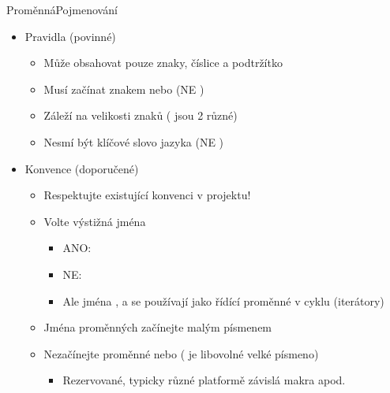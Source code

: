 \begin{frame}{Proměnná}{Pojmenování}

  \begin{itemize}
    \item Pravidla (povinné)
    \begin{itemize}
      \item Může obsahovat pouze znaky, číslice a podtržítko

      \pause

      \item Musí začínat znakem nebo \code{_} (NE )

      \pause

      \item Záleží na velikosti znaků ( jsou 2 různé)

      \pause

      \item Nesmí být klíčové slovo jazyka (NE )
    \end{itemize}

    \pause

    \item Konvence (doporučené)
    \begin{itemize}
      \item Respektujte existující konvenci v projektu!

      \pause

      \item Volte výstižná jména
      \begin{itemize}
	\item ANO: 

	\pause

	\item NE: 

	\pause

	\item Ale jména ,  a  se používají jako řídící
	  proměnné v cyklu (iterátory)
      \end{itemize}

      \pause

      \item Jména proměnných začínejte malým písmenem

      \pause

      \item Nezačínejte proměnné \code{__} nebo  ( je
        libovolné velké písmeno)
      \begin{itemize}
	\item Rezervované, typicky různé platformě závislá makra apod.
      \end{itemize}


\end{itemize}
\end{itemize}
\end{frame}
